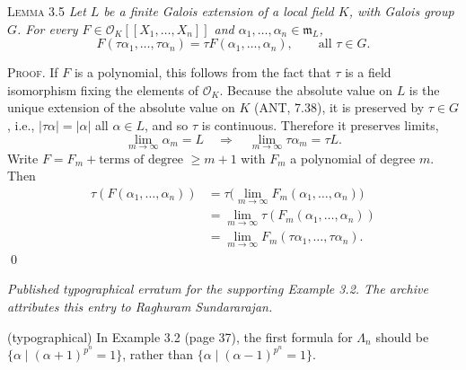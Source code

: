 \documentclass[11pt,a4paper]{article}
\begin{document}
\medskip
\noindent\textsc{Lemma 3.5}
\emph{Let $L$ be a finite Galois extension of a local field $K$, with
Galois group $G$. For every $F\in\mathcal O_K[[X_1,\ldots,X_n]]$ and
$\alpha_1,\ldots,\alpha_n\in\mathfrak m_L$,}
\[
F(\tau\alpha_1,\ldots,\tau\alpha_n)=\tau F(\alpha_1,\ldots,\alpha_n),
\qquad\text{all $\tau\in G$.}
\]

\noindent\textsc{Proof.} If $F$ is a polynomial, this follows from the
fact that $\tau$ is a field isomorphism fixing the elements of
$\mathcal O_K$. Because the absolute value on $L$ is the unique extension
of the absolute value on $K$ (ANT, 7.38), it is preserved by $\tau\in G$,
i.e., $|\tau\alpha|=|\alpha|$ all $\alpha\in L$, and so $\tau$ is
continuous. Therefore it preserves limits,
\[
\lim_{m\to\infty}\alpha_m=L\quad\Rightarrow\quad
 \lim_{m\to\infty}\tau\alpha_m=\tau L.
\]
Write $F=F_m+\text{terms of degree }\geq m+1$ with $F_m$ a polynomial
of degree $m$. Then
\[
\begin{aligned}
\tau(F(\alpha_1,\ldots,\alpha_n))
 &=\tau\bigl(\lim_{m\to\infty}F_m(\alpha_1,\ldots,\alpha_n)\bigr)\\
 &=\lim_{m\to\infty}\tau(F_m(\alpha_1,\ldots,\alpha_n))\\
 &=\lim_{m\to\infty}F_m(\tau\alpha_1,\ldots,\tau\alpha_n).
\end{aligned}
\]
\qed

\medskip
\noindent\emph{Published typographical erratum for the supporting
Example 3.2. The archive attributes this entry to Raghuram Sundararajan.}
\par\medskip
\noindent (typographical) In Example 3.2 (page 37), the first formula for
$\Lambda_n$ should be $\{\alpha\mid(\alpha+1)^{p^n}=1\}$, rather than
$\{\alpha\mid(\alpha-1)^{p^n}=1\}$.
\end{document}
